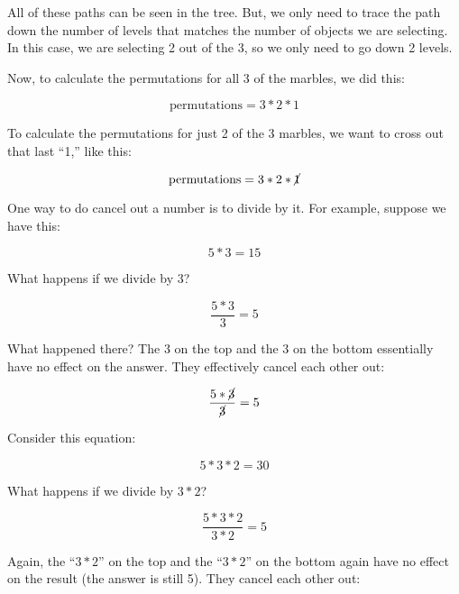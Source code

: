 \documentclass[../../../main.tex]{subfiles}
\begin{document}
All of these paths can be seen in the tree. But, we only need to trace the path down the number of levels that matches the number of objects we are selecting. In this case, we are selecting 2 out of the 3, so we only need to go down 2 levels. 

Now, to calculate the permutations for all 3 of the marbles, we did this:

\begin{equation*}
  \text{permutations} = 3 * 2 * 1
\end{equation*}

\noindent
To calculate the permutations for just 2 of the 3 marbles, we want to cross out that last ``1,'' like this:

\begin{equation*}
  \text{permutations} = 3 * 2 * \cancel{1}
\end{equation*}

\noindent
One way to do cancel out a number is to divide by it. For example, suppose we have this:

\begin{equation*}
  5 * 3 = 15
\end{equation*}

\noindent
What happens if we divide by 3?

\begin{equation*}
  \frac{5 * 3}{3} = 5
\end{equation*}

\noindent
What happened there? The 3 on the top and the 3 on the bottom essentially have no effect on the answer. They effectively cancel each other out:

\begin{equation*}
  \frac{5 * \cancel{3}}{\cancel{3}} = 5
\end{equation*}

\noindent
Consider this equation:

\begin{equation*}
  5 * 3 * 2 = 30
\end{equation*}

\noindent
What happens if we divide by $3 * 2$?

\begin{equation*}
  \frac{5 * 3 * 2}{3 * 2} = 5
\end{equation*}

\noindent
Again, the ``$3 * 2$'' on the top and the ``$3 * 2$'' on the bottom again have no effect on the result (the answer is still 5). They cancel each other out:
\end{document}
